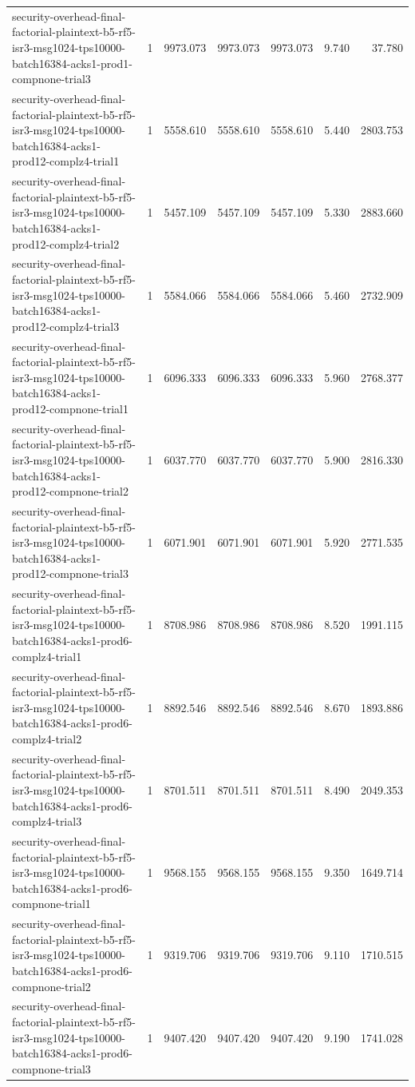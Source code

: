 \begin{tabular}{lrrrrrr}
security-overhead-final-factorial-plaintext-b5-rf5-isr3-msg1024-tps10000-batch16384-acks1-prod1-compnone-trial3 & 1 & 9973.073 & 9973.073 & 9973.073 & 9.740 & 37.780 \\
security-overhead-final-factorial-plaintext-b5-rf5-isr3-msg1024-tps10000-batch16384-acks1-prod12-complz4-trial1 & 1 & 5558.610 & 5558.610 & 5558.610 & 5.440 & 2803.753 \\
security-overhead-final-factorial-plaintext-b5-rf5-isr3-msg1024-tps10000-batch16384-acks1-prod12-complz4-trial2 & 1 & 5457.109 & 5457.109 & 5457.109 & 5.330 & 2883.660 \\
security-overhead-final-factorial-plaintext-b5-rf5-isr3-msg1024-tps10000-batch16384-acks1-prod12-complz4-trial3 & 1 & 5584.066 & 5584.066 & 5584.066 & 5.460 & 2732.909 \\
security-overhead-final-factorial-plaintext-b5-rf5-isr3-msg1024-tps10000-batch16384-acks1-prod12-compnone-trial1 & 1 & 6096.333 & 6096.333 & 6096.333 & 5.960 & 2768.377 \\
security-overhead-final-factorial-plaintext-b5-rf5-isr3-msg1024-tps10000-batch16384-acks1-prod12-compnone-trial2 & 1 & 6037.770 & 6037.770 & 6037.770 & 5.900 & 2816.330 \\
security-overhead-final-factorial-plaintext-b5-rf5-isr3-msg1024-tps10000-batch16384-acks1-prod12-compnone-trial3 & 1 & 6071.901 & 6071.901 & 6071.901 & 5.920 & 2771.535 \\
security-overhead-final-factorial-plaintext-b5-rf5-isr3-msg1024-tps10000-batch16384-acks1-prod6-complz4-trial1 & 1 & 8708.986 & 8708.986 & 8708.986 & 8.520 & 1991.115 \\
security-overhead-final-factorial-plaintext-b5-rf5-isr3-msg1024-tps10000-batch16384-acks1-prod6-complz4-trial2 & 1 & 8892.546 & 8892.546 & 8892.546 & 8.670 & 1893.886 \\
security-overhead-final-factorial-plaintext-b5-rf5-isr3-msg1024-tps10000-batch16384-acks1-prod6-complz4-trial3 & 1 & 8701.511 & 8701.511 & 8701.511 & 8.490 & 2049.353 \\
security-overhead-final-factorial-plaintext-b5-rf5-isr3-msg1024-tps10000-batch16384-acks1-prod6-compnone-trial1 & 1 & 9568.155 & 9568.155 & 9568.155 & 9.350 & 1649.714 \\
security-overhead-final-factorial-plaintext-b5-rf5-isr3-msg1024-tps10000-batch16384-acks1-prod6-compnone-trial2 & 1 & 9319.706 & 9319.706 & 9319.706 & 9.110 & 1710.515 \\
security-overhead-final-factorial-plaintext-b5-rf5-isr3-msg1024-tps10000-batch16384-acks1-prod6-compnone-trial3 & 1 & 9407.420 & 9407.420 & 9407.420 & 9.190 & 1741.028 \\

\end{tabular}
